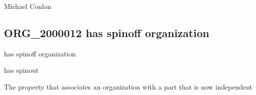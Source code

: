 \documentclass[letterpaper,10pt,english]{sphinxmanual}
\begin{document}
\begin{sphinxShadowBox}

\sphinxAtStartPar
{}
\end{sphinxShadowBox}

\begin{sphinxShadowBox}

\sphinxAtStartPar
Michael Conlon 
\end{sphinxShadowBox}
\begin{quote}

\ignorespaces \end{quote}


\subsection{ORG\_2000012 \sphinxhyphen{} has spin\sphinxhyphen{}off organization}
\label{\detokenize{doc-ORG_2000012:org-2000012-has-spin-off-organization}}\label{\detokenize{doc-ORG_2000012:index-0}}\label{\detokenize{doc-ORG_2000012::doc}}
\begin{sphinxShadowBox}

\sphinxAtStartPar
has spin\sphinxhyphen{}off organization
\end{sphinxShadowBox}

\begin{sphinxShadowBox}

\sphinxAtStartPar
has spinout
\end{sphinxShadowBox}

\begin{sphinxShadowBox}

\sphinxAtStartPar
{}
\end{sphinxShadowBox}

\begin{sphinxShadowBox}

\sphinxAtStartPar
The property that associates an organization with a part that is now independent
\end{sphinxShadowBox}
\end{document}
